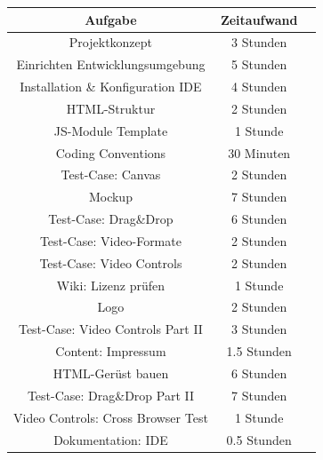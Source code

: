 \documentclass[a4paper,10pt]{scrartcl}
\begin{document}
\begin{tabular}{|c|c|c|}\hline
	\textbf{Aufgabe} & \textbf{Zeitaufwand} \\ \hline
	
	Projektkonzept & 3 Stunden \\ \hline
	
	Einrichten Entwicklungsumgebung & 5 Stunden \\ \hline
	
	Installation \& Konfiguration IDE & 4 Stunden \\ \hline
	
	HTML-Struktur & 2 Stunden \\ \hline
	
	JS-Module Template & 1 Stunde \\ \hline
	
	Coding Conventions & 30 Minuten \\ \hline
	
	Test-Case: Canvas & 2 Stunden \\ \hline
	
	Mockup & 7 Stunden \\ \hline
	
	Test-Case: Drag\&Drop & 6 Stunden \\ \hline
	
	Test-Case: Video-Formate & 2 Stunden \\ \hline
	
	Test-Case: Video Controls & 2 Stunden \\ \hline
		
	Wiki: Lizenz prüfen & 1 Stunde \\ \hline
	
	Logo & 2 Stunden \\ \hline
	
	Test-Case: Video Controls Part II & 3 Stunden \\ \hline
	
	Content: Impressum & 1.5 Stunden \\ \hline
	
	HTML-Gerüst bauen & 6 Stunden \\ \hline
	
	Test-Case: Drag\&Drop Part II & 7 Stunden \\ \hline
	
	Video Controls: Cross Browser Test & 1 Stunde \\ \hline
	
	Dokumentation: IDE & 0.5 Stunden \\ \hline
	

\end{tabular}
\end{document}
